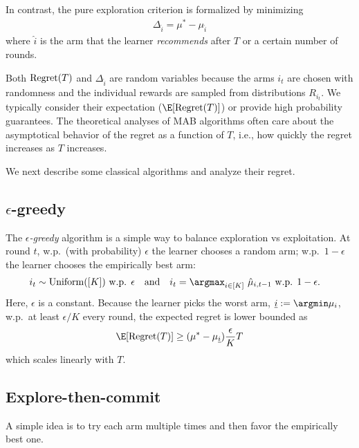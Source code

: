 In contrast, the pure exploration criterion is formalized by minimizing
\begin{align*}
\Delta_{\hat{i}} = \mu^{*}-\mu_{\hat{i}}
\end{align*}
where $\hat{i}$ is the arm that the learner {\em recommends} after $T$ or a certain number of rounds.

Both $\operatorname{Regret}(T)$ and $\Delta_{\hat{i}}$ are random variables because the arms $i_t$ are chosen with randomness and the individual rewards are sampled from distributions $R_{i_t}$. 
We typically consider their expectation ($\E[\Regret(T)]$) or provide high probability guarantees.
The theoretical analyses of MAB algorithms often care about the asymptotical behavior of the regret as a function of $T$, i.e., how quickly the regret increases as $T$ increases.

We next describe some classical algorithms and analyze their regret.

\subsection{$\epsilon$-greedy}
The {\em $\epsilon$-greedy} algorithm is a simple way to balance exploration vs exploitation.
At round $t$, w.p.~(with probability) $\epsilon$ the learner chooses a random arm; w.p.~$1-\epsilon$ the learner chooses the empirically best arm:
\begin{align*}
    &i_t \sim {\rm Uniform}([K]) \text{ w.p. $\epsilon$} 
    \quad \text{and} \quad 
    i_t =\textstyle\argmax_{i\in[K]}~\hat{\mu}_{i,t-1} \text{ w.p. $1-\epsilon$}.
\end{align*}
Here, $\epsilon$ is a constant.
Because the learner picks the worst arm, $\underline{i}:=\argmin \mu_i$, w.p.~at least $\epsilon/K$ every round, the expected regret is lower bounded as 
\begin{align}
\label{eq:epsilon_greedy-regret}
    \E[\Regret(T)] \geq (\mu^*-\mu_{\underline{i}})\frac{\epsilon}{K}T
\end{align}
which scales linearly with $T$.

\subsection{Explore-then-commit}
A simple idea is to try each arm multiple times and then favor the empirically best one.

